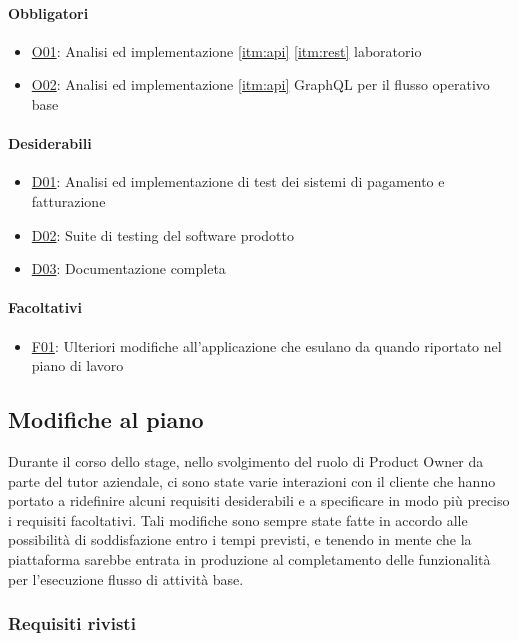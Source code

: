 \paragraph{Obbligatori}
\begin{itemize}
    \item \underline{O01}: Analisi ed implementazione \ref{itm:api} \ref{itm:rest} laboratorio
    \item \underline{O02}: Analisi ed implementazione \ref{itm:api} GraphQL per il flusso operativo base
\end{itemize}
\vspace{-15pt}
\paragraph{Desiderabili}
\begin{itemize}
    \item \underline{D01}: Analisi ed implementazione di test dei sistemi di pagamento e fatturazione
    \item \underline{D02}: Suite di testing del software prodotto
    \item \underline{D03}: Documentazione completa
\end{itemize}
\vspace{-15pt}
\paragraph{Facoltativi}
\begin{itemize}
    \item \underline{F01}: Ulteriori modifiche all’applicazione che esulano da quando riportato nel piano di lavoro
\end{itemize}
\subsection{Modifiche al piano}
Durante il corso dello stage, nello svolgimento del ruolo di Product Owner da parte del tutor aziendale, ci sono state varie interazioni con il cliente che hanno portato a ridefinire alcuni requisiti desiderabili e a specificare in modo più preciso i requisiti facoltativi. Tali modifiche sono sempre state fatte in accordo alle possibilità di soddisfazione entro i tempi previsti, e tenendo in mente che la piattaforma sarebbe entrata in produzione al completamento delle funzionalità per l'esecuzione flusso di attività base.
\subsubsection{Requisiti rivisti}
